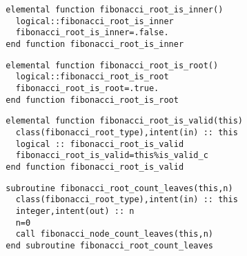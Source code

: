 \begin{Verbatim}
  elemental function fibonacci_root_is_inner()
    logical::fibonacci_root_is_inner
    fibonacci_root_is_inner=.false.
  end function fibonacci_root_is_inner
\end{Verbatim}

\begin{Verbatim}
  elemental function fibonacci_root_is_root()
    logical::fibonacci_root_is_root
    fibonacci_root_is_root=.true.
  end function fibonacci_root_is_root
\end{Verbatim}

\begin{Verbatim}
  elemental function fibonacci_root_is_valid(this)
    class(fibonacci_root_type),intent(in) :: this
    logical :: fibonacci_root_is_valid
    fibonacci_root_is_valid=this%is_valid_c
  end function fibonacci_root_is_valid
\end{Verbatim}

\begin{Verbatim}
  subroutine fibonacci_root_count_leaves(this,n)
    class(fibonacci_root_type),intent(in) :: this
    integer,intent(out) :: n
    n=0
    call fibonacci_node_count_leaves(this,n)
  end subroutine fibonacci_root_count_leaves
\end{Verbatim}

